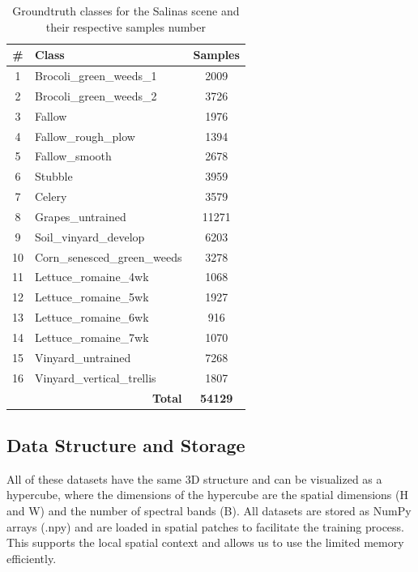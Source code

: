 \begin{table}[H]
    \centering
    \caption{Groundtruth classes for the Salinas scene and their respective samples number}
    \label{tab:salinas_classes}
    \renewcommand{\arraystretch}{1.2}
    \begin{tabular}{|c|l|c|}
        \hline
        \textbf{\#} & \textbf{Class} & \textbf{Samples} \\ \hline
        1 & Brocoli\_green\_weeds\_1 & 2009 \\ \hline
        2 & Brocoli\_green\_weeds\_2 & 3726 \\ \hline
        3 & Fallow & 1976 \\ \hline
        4 & Fallow\_rough\_plow & 1394 \\ \hline
        5 & Fallow\_smooth & 2678 \\ \hline
        6 & Stubble & 3959 \\ \hline
        7 & Celery & 3579 \\ \hline
        8 & Grapes\_untrained & 11271 \\ \hline
        9 & Soil\_vinyard\_develop & 6203 \\ \hline
        10 & Corn\_senesced\_green\_weeds & 3278 \\ \hline
        11 & Lettuce\_romaine\_4wk & 1068 \\ \hline
        12 & Lettuce\_romaine\_5wk & 1927 \\ \hline
        13 & Lettuce\_romaine\_6wk & 916 \\ \hline
        14 & Lettuce\_romaine\_7wk & 1070 \\ \hline
        15 & Vinyard\_untrained & 7268 \\ \hline
        16 & Vinyard\_vertical\_trellis & 1807 \\ \hline
        \multicolumn{2}{|r|}{\textbf{Total}} & \textbf{54129} \\ \hline
    \end{tabular}
\end{table}

\subsection{Data Structure and Storage}
All of these datasets have the same 3D structure and can be visualized as a hypercube, where the dimensions of the hypercube are the spatial dimensions (H and W) and the number of spectral bands (B). All datasets are stored as NumPy arrays (.npy) and are loaded in spatial patches to facilitate the training process. This supports the local spatial context and allows us to use the limited memory efficiently.

